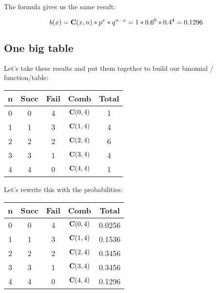 \documentclass[../../../main.tex]{subfiles}
\begin{document}
The formula gives us the same result:

\begin{equation*}
  \Binom{\RandVarVal/} = \combs{\RandVarVal/}{n} * p^{\RandVarVal/} * q^{n - \RandVarVal/} = 1 * 0.6^{0} * 0.4^{4} = 0.1296
\end{equation*}


\subsection{One big table}

Let's take these results and put them together to build our binomial \PDFtext/ function/table:

\begin{center}
  \begin{tabular}{| c | c | c | c | c |}
    \hline
  \textbf{n} & \textbf{Succ} & \textbf{Fail} & \textbf{Comb} & \textbf{Total} \\ \hline
  0 & 0    & 4    & $\mathbf{C}(0, 4)$ & 1 \\ \hline
  1 & 1    & 3    & $\mathbf{C}(1, 4)$ & 4 \\ \hline
  2 & 2    & 2    & $\mathbf{C}(2, 4)$ & 6 \\ \hline
  3 & 3    & 1    & $\mathbf{C}(3, 4)$ & 4 \\ \hline
  4 & 4    & 0    & $\mathbf{C}(4, 4)$ & 1 \\ \hline
  \end{tabular}
\end{center}

\noindent
Let's rewrite this with the probabilities:

\begin{center}
  \begin{tabular}{| c | c | c | c | c |}
    \hline
  \textbf{n} & \textbf{Succ} & \textbf{Fail} & \textbf{Comb} & \textbf{Total} \\ \hline
  0 & 0    & 4    & $\mathbf{C}(0, 4)$ & 0.0256 \\ \hline
  1 & 1    & 3    & $\mathbf{C}(1, 4)$ & 0.1536 \\ \hline
  2 & 2    & 2    & $\mathbf{C}(2, 4)$ & 0.3456 \\ \hline
  3 & 3    & 1    & $\mathbf{C}(3, 4)$ & 0.3456 \\ \hline
  4 & 4    & 0    & $\mathbf{C}(4, 4)$ & 0.1296 \\ \hline
  \end{tabular}
\end{center}
\end{document}
